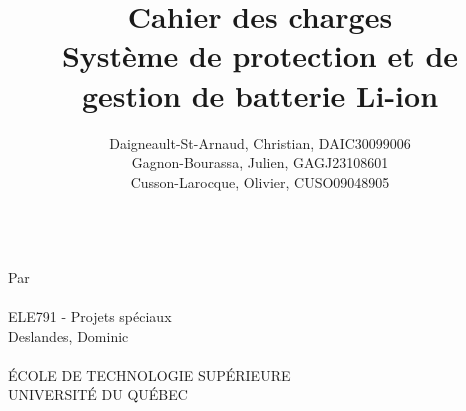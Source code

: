 
\title{
	\textbf{Cahier des charges} \\
	\vspace{2cm}
	Système de protection et de gestion de batterie Li-ion	
	}
\author{
	Daigneault-St-Arnaud, Christian, DAIC30099006 \\
	Gagnon-Bourassa, Julien, GAGJ23108601 \\
	Cusson-Larocque, Olivier, CUSO09048905	
}
\newcommand{\cours}{ELE791 - Projets spéciaux }
\newcommand{\prof}{Deslandes, Dominic}



\makeatletter
\begin{titlepage}

	
	\thispagestyle{empty}
	\centering
	{\Huge \@title}\\ 
	\vspace{2cm}
	{\large Par \\
		\vspace{0.5cm}
		\@author \\
		\vspace{2cm}
		\cours \\
		\vspace{0.5cm}
		\prof \\
		\vspace{3.0cm}
		\@date \\
		\vspace{3.0cm}
		\'{E}COLE DE TECHNOLOGIE SUP\'{E}RIEURE \\
		UNIVERSIT\'{E} DU QUÉBEC
	}
\end{titlepage}
\makeatother





